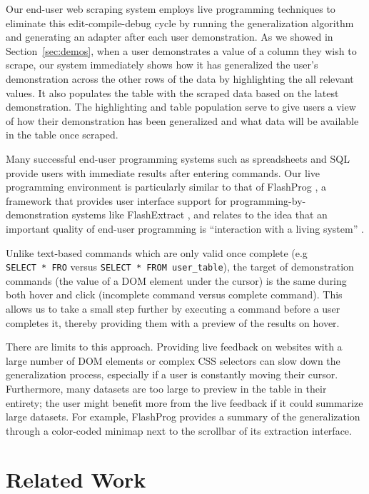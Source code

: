 \documentclass[sigconf,10pt]{acmart}
\begin{document}
Our end-user web scraping system employs live programming techniques to
eliminate this edit-compile-debug cycle by running the generalization
algorithm and generating an adapter after each user demonstration. As we
showed in Section~\ref{sec:demos}, when a user demonstrates a value of a
column they wish to scrape, our system immediately shows how it has
generalized the user's demonstration across the other rows of the data
by highlighting the all relevant values. It also populates the table
with the scraped data based on the latest demonstration. The
highlighting and table population serve to give users a view of how
their demonstration has been generalized and what data will be available
in the table once scraped.

Many successful end-user programming systems such as spreadsheets and
SQL provide users with immediate results after entering commands. Our
live programming environment is particularly similar to that of
FlashProg \citep{mayer2015}, a framework that provides user interface
support for programming-by-demonstration systems like FlashExtract
\citep{le2014}, and relates to the idea that an important quality of
end-user programming is ``interaction with a living system''
\citep{zotero-1362}.

Unlike text-based commands which are only valid once complete (e.g
\texttt{SELECT\ *\ FRO} versus \texttt{SELECT\ *\ FROM\ user\_table}),
the target of demonstration commands (the value of a DOM element under
the cursor) is the same during both hover and click (incomplete command
versus complete command). This allows us to take a small step further by
executing a command before a user completes it, thereby providing them
with a preview of the results on hover.

There are limits to this approach. Providing live feedback on websites
with a large number of DOM elements or complex CSS selectors can slow
down the generalization process, especially if a user is constantly
moving their cursor. Furthermore, many datasets are too large to preview
in the table in their entirety; the user might benefit more from the
live feedback if it could summarize large datasets. For example,
FlashProg provides a summary of the generalization through a color-coded
minimap next to the scrollbar of its extraction interface.

\hypertarget{sec:related-work}{%
\section{Related Work}\label{sec:related-work}}
\end{document}

